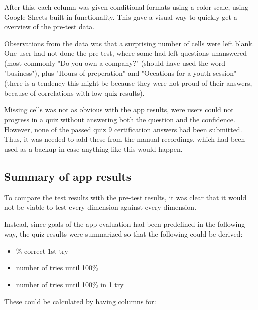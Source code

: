 After this, each column was given conditional formats using a color scale, using Google Sheets built-in functionality. This gave a visual way to quickly get a overview of the pre-test data.

Observations from the data was that a surprising number of cells were left blank. One user had not done the pre-test, where some had left questions unanswered (most commonly "Do you own a company?" (should have used the word "business"), plus "Hours of preperation" and "Occations for a youth session" (there is a tendency this might be because they were not proud of their answers, because of correlations with low quiz results).

Missing cells was not as obvious with the app results, were users could not progress in a quiz without answering both the question and the confidence. However, none of the passed quiz 9 certification answers had been submitted. Thus, it was needed to add these from the manual recordings, which had been used as a backup in case anything like this would happen.

\subsection{Summary of app results}

To compare the test results with the pre-test results, it was clear that it would not be viable to test every dimension against every dimension.

Instead, since goals of the app evaluation had been predefined in the following way, the quiz results were summarized so that the following could be derived:

\begin{itemize}
\item \% correct 1st try
\item number of tries until 100\%
\item number of tries until 100\% in 1 try
\end{itemize}

These could be calculated by having columns for:

